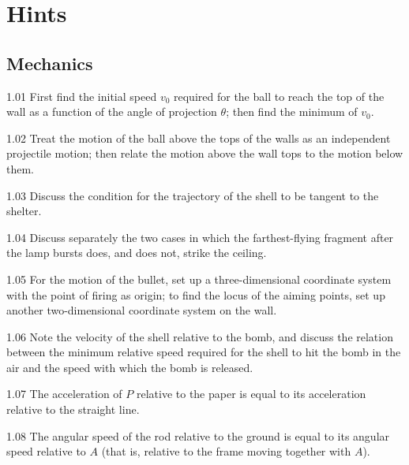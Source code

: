 \chapter{Hints}

\section{Mechanics}

\begin{hint}{1.01}
First find the initial speed $v_0$ required for the ball to reach the top of the wall as a function of the angle of projection $\theta$; then find the minimum of $v_0$.
\end{hint}

\begin{hint}{1.02}
Treat the motion of the ball above the tops of the walls as an independent projectile motion; then relate the motion above the wall tops to the motion below them.
\end{hint}

\begin{hint}{1.03}
Discuss the condition for the trajectory of the shell to be tangent to the shelter.
\end{hint}

\begin{hint}{1.04}
Discuss separately the two cases in which the farthest-flying fragment after the lamp bursts does, and does not, strike the ceiling.
\end{hint}

\begin{hint}{1.05}
For the motion of the bullet, set up a three-dimensional coordinate system with the point of firing as origin; to find the locus of the aiming points, set up another two-dimensional coordinate system on the wall.
\end{hint}

\begin{hint}{1.06}
Note the velocity of the shell relative to the bomb, and discuss the relation between the minimum relative speed required for the shell to hit the bomb in the air and the speed with which the bomb is released.
\end{hint}

\begin{hint}{1.07}
The acceleration of $P$ relative to the paper is equal to its acceleration relative to the straight line.
\end{hint}

\begin{hint}{1.08}
The angular speed of the rod relative to the ground is equal to its angular speed relative to $A$ (that is, relative to the frame moving together with $A$).
\end{hint}

